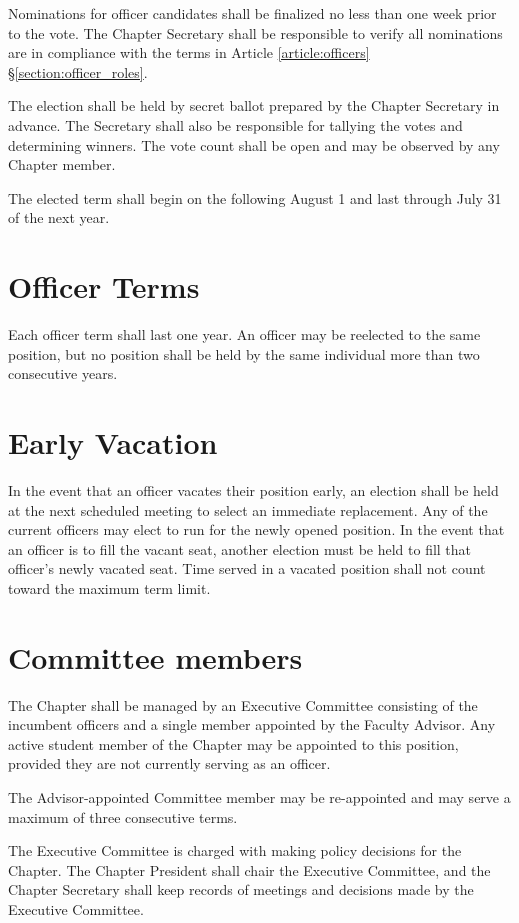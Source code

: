 \documentclass{ronr-bylaws}
\newcommand{\refsection}[2]{Article \ref{#1} \S \ref{#2}}
\begin{document}
Nominations for officer candidates shall be finalized no less than one week prior to the vote. The
Chapter Secretary shall be responsible to verify all nominations are in compliance with the terms
in \refsection{article:officers}{section:officer_roles}.

The election shall be held by secret ballot prepared by the Chapter Secretary in advance. The
Secretary shall also be responsible for tallying the votes and determining winners. The vote count
shall be open and may be observed by any Chapter member.

The elected term shall begin on the following August 1 and last through July 31 of the next year.

\section{Officer Terms}
Each officer term shall last one year. An officer may be reelected to the same position,
but no position shall be held by the same individual more than two consecutive years.

\section{Early Vacation}\label{section:early_vacation}
In the event that an officer vacates their position early, an election shall be held at the next
scheduled meeting to select an immediate replacement. Any of the current officers may elect to
run for the newly opened position. In the event that an officer is to fill the vacant seat, another
election must be held to fill that officer’s newly vacated seat. Time served in a vacated position
shall not count toward the maximum term limit.

\label{article:executive_committee}
\section{Committee members}
The Chapter shall be managed by an Executive Committee consisting of the incumbent
officers and a single member appointed by the Faculty Advisor. Any active student member of the
Chapter may be appointed to this position, provided they are not currently serving as an officer.

The Advisor-appointed Committee member  may be re-appointed and may serve a maximum  of
three consecutive terms.

The Executive Committee is charged with making policy decisions for the Chapter. The Chapter
President shall chair the Executive Committee, and the Chapter Secretary shall keep records of
meetings and decisions made by the Executive Committee.
\end{document}
